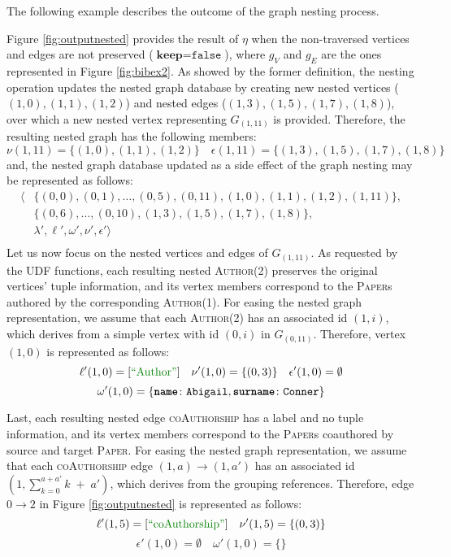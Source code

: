 The following example describes the outcome of the graph nesting process.

\begin{ex}[label=exNest]
Figure \ref{fig:outputnested} provides the result of $\eta$ when the non-traversed vertices and edges are not preserved ($\textbf{keep}=\texttt{false}$), where $g_V$ and $g_E$ are the ones represented in Figure \ref{fig:bibex2}. As showed by the former definition, the nesting operation updates the nested graph database by creating new nested vertices ($(1,0),(1,1),(1,2)$) and nested edges ($(1,3),(1,5),(1,7),(1,8)$), over which a new nested vertex representing $G_{(1,11)}$ is provided. Therefore, the resulting nested graph has the following members:
\[\nu(1,11)=\{(1,0),(1,1),(1,2)\}\quad \epsilon(1,11)=\{(1,3),(1,5),(1,7),(1,8)\}\]
and, the nested graph database updated as a side effect of the graph nesting may be represented as follows:
\[\begin{split}
\big\langle &\{(0,0),(0,1),\dots,(0,5),(0,11),(1,0),(1,1),(1,2),(1,11)\},\\
	  & \{(0,6),\dots,(0,10),(1,3),(1,5),(1,7),(1,8)\}, \\
	  & \lambda',\ell',\omega',\nu',\epsilon'\big\rangle\\
\end{split}\]
Let us now focus on the nested vertices and edges of $G_{(1,11)}$. As requested by the UDF functions, each resulting nested \textsc{Author}(2) preserves the original  vertices' tuple information, and its vertex members correspond to the \textsc{Paper}s authored by the corresponding \textsc{Author}(1). For easing the nested graph representation, we assume that each \textsc{Author}(2) has an associated  id $(1,i)$, which derives from a simple vertex with id $(0,i)$ in $G_{(0,11)}$. Therefore, vertex $(1,0)$ is represented as follows:
\[\ell'(1,0)=[\mstr{Author}]\quad\nu'(1,0)=\{(0,3)\}\quad \epsilon'(1,0)=\emptyset\] \[\omega'(1,0)=\{\texttt{\textbf{name}}\colon\texttt{Abigail},\texttt{\textbf{surname}}\colon\texttt{Conner}\}\]

Last, each resulting nested edge \textsc{coAuthorship} has a  label and no tuple information, and its vertex members correspond to the \textsc{Paper}s coauthored by source and target \textsc{Paper}.
For easing the nested graph representation, we assume that each \textsc{coAuthorship} edge $(1,a)\to (1,a')$ has an associated id $(1,\sum_{k=0}^{a+a'}k\;+\;a')$, which derives from the grouping references. Therefore, edge $0\to 2$ in Figure \ref{fig:outputnested} is represented as follows:
\[\ell'(1,5)=[\mstr{coAuthorship}]\quad\nu'(1,5)=\{(0,3)\}\] \[\epsilon'(1,0)=\emptyset\quad \omega'(1,0)=\{\}\]
\end{ex}


